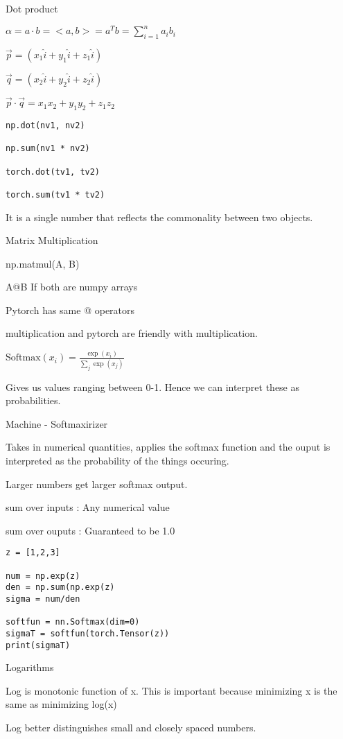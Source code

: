 \documentclass[30pt, a4]{article}
\begin{document}
Dot product
{    
\Large
$\alpha = a \cdot b = <a,b> = a^Tb = \sum\limits_{i=1}^n a_ib_i$

$\vec{p}=(x_{1}\hat{i}+y_{1}\hat{i}+z_{1}\hat{i})$

$\vec{q}=(x_{2}\hat{i}+y_{2}\hat{i}+z_{2}\hat{i})$

$\vec{p}\cdot\vec{q}=x_{1}x_{2}+y_{1}y_{2}+z_{1}z_{2}$
}

\begin{lstlisting}
np.dot(nv1, nv2)

np.sum(nv1 * nv2)

torch.dot(tv1, tv2)

torch.sum(tv1 * tv2)
\end{lstlisting}
It is a single number that reflects the commonality between two objects.

Matrix Multiplication

np.matmul(A, B)

A@B If both are numpy arrays

Pytorch has same @ operators

multiplication and pytorch are friendly with multiplication.

{
\Large
$\text{Softmax}(x_{i}) = \frac{\exp(x_i)}{\sum_j \exp(x_j)}$
}

Gives us values ranging between 0-1. Hence we can interpret these as probabilities.

Machine - Softmaxirizer 

Takes in numerical quantities, applies the softmax function and the ouput is
interpreted as the probability of the things occuring.

Larger numbers get larger softmax output.

sum over inputs : Any numerical value

sum over ouputs : Guaranteed to be 1.0

\begin{lstlisting}
z = [1,2,3]

num = np.exp(z)
den = np.sum(np.exp(z)
sigma = num/den

softfun = nn.Softmax(dim=0)
sigmaT = softfun(torch.Tensor(z))
print(sigmaT)
\end{lstlisting}

Logarithms

Log is monotonic function of x. This is important because minimizing x is the 
same as minimizing log(x)

Log better distinguishes small and closely spaced numbers.
\end{document}
